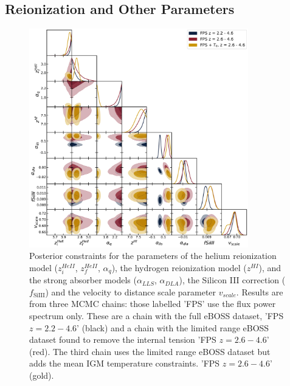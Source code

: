 \subsection{Reionization and Other Parameters}\label{sec:astro}

\begin{figure}
    \centering
    \includegraphics[width=0.85\textwidth]{figures/astro_corner.pdf}
    \caption{\label{fig:astro_corner}
    Posterior constraints for the parameters of the helium reionization model ($z_i^{HeII}$, $z_f^{HeII}$, $\alpha_q$), the hydrogen reionization model ($z^{HI}$), and the strong absorber models ($\alpha_{LLS}$, $\alpha_{DLA}$), the Silicon III correction ($f_\mathrm{SiIII}$) and the velocity to distance scale parameter $v_{scale}$.
    Results are from three MCMC chains: those labelled 'FPS' use the flux power spectrum only. These are a chain with the full eBOSS dataset, 'FPS $z=2.2 - 4.6$' (black) and a chain with the limited range eBOSS dataset found to remove the internal tension 'FPS $z=2.6 - 4.6$' (red). The third chain uses the limited range eBOSS dataset but adds the mean IGM temperature constraints. 'FPS $z=2.6 - 4.6$' (gold).
    }
\end{figure}

